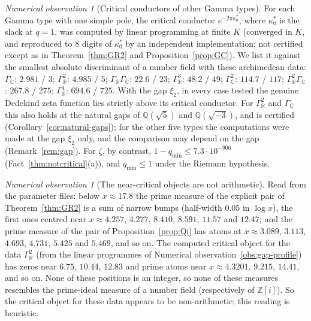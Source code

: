 \documentclass[11pt]{amsart}
\newcommand{\ZZ}{\mathbb Z}
\newcommand{\QQ}{\mathbb Q}
\newcommand{\xin}[1]{\xi_{#1}}
\newcommand{\GR}{\Gamma_{\mathbb R}}
\newcommand{\GC}{\Gamma_{\mathbb C}}
\newcommand{\kstar}{\kappa^{*}}
\newcommand{\qmin}{q_{\min}}
\theoremstyle{definition}
\theoremstyle{remark}
\newtheorem{observation}[theorem]{Numerical observation}
\numberwithin{equation}{section}
\begin{document}
\begin{observation}[Critical conductors of other Gamma types]\label{obs:critical-conductors}
For each Gamma type with one simple pole, the critical conductor $e^{-2\pi\kstar_0}$, where $\kstar_0$ is the slack at
$q=1$, was computed by linear programming at finite $K$ (converged in $K$, and reproduced to $8$ digits of $\kstar_0$ by
an independent implementation; not certified except as in Theorem~\ref{thm:GR2} and Proposition~\ref{prop:GC}). We list it
against the smallest absolute discriminant of a number field with these archimedean data:
$\GC$: $2.981$ / $3$; $\GR^2$: $4.985$ / $5$; $\GR\GC$: $22.6$ / $23$; $\GR^3$: $48.2$ / $49$; $\GC^2$: $114.7$ / $117$;
$\GR^2\GC$: $267.8$ / $275$; $\GR^4$: $694.6$ / $725$. With the gap $\xin2$, in every case tested the genuine Dedekind zeta
function lies strictly above its critical conductor. For $\GR^2$ and $\GC$ this also holds at the natural gaps of $\QQ(\sqrt5)$ and
$\QQ(\sqrt{-3})$, and is certified (Corollary~\ref{cor:natural-gaps}); for the other five types the computations were made at the gap
$\xin2$ only, and the comparison may depend on the gap (Remark~\ref{rem:gap}). For $\zeta$, by contrast, $1-\qmin\le7.3\cdot10^{-906}$ (Fact~\ref{thm:notcritical}(a)),
and $\qmin\le1$ under the Riemann hypothesis.
\end{observation}

\begin{observation}[The near-critical objects are not arithmetic]\label{obs:nonarith}
Read from the parameter files: below $x\approx17.8$ the prime measure of the explicit pair of Theorem~\ref{thm:GR2} is a sum of
narrow bumps (half-width $0.05$ in $\log x$), the first ones centred near $x\approx4.257$, $4.277$, $8.410$, $8.591$, $11.57$ and $12.47$;
and the prime measure of the pair of Proposition~\ref{prop:Qi} has atoms at $x\approx3.089$, $3.113$, $4.693$, $4.731$, $5.425$ and
$5.469$, and so on. The computed critical object for the data $\GR^2$ (from the linear programmes of Numerical
observation~\ref{obs:gap-profile}) has zeros near $6.75$, $10.44$, $12.83$ and prime atoms near $x\approx4.3201$, $9.215$, $14.41$, and
so on. None of these positions is an integer, so none of these measures resembles the
prime-ideal measure of a number field (respectively of $\ZZ[i]$). So the critical object for these data appears to be
non-arithmetic; this reading is heuristic.
\end{observation}
\end{document}
